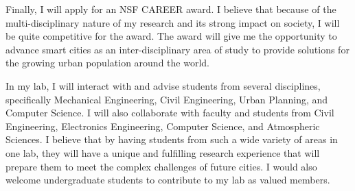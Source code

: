 \documentclass[12pt]{article}
\begin{document}
Finally, I will apply for an NSF CAREER award. I believe that because of the multi-disciplinary nature of my research and its strong impact on society, I will be quite competitive for the award. The award will give me the opportunity to advance smart cities as an inter-disciplinary area of study to provide solutions for the growing urban population around the world.  

In my lab, I will interact with and advise students from several disciplines, specifically Mechanical Engineering, Civil Engineering, Urban Planning, and Computer Science. I will also collaborate with faculty and students from Civil Engineering, Electronics Engineering, Computer Science, and Atmospheric Sciences. I believe that by having students from such a wide variety of areas in one lab, they will have a unique and fulfilling research experience that will prepare them to meet the complex challenges of future cities. I would also welcome undergraduate students to contribute to my lab as valued members.
\end{document}
